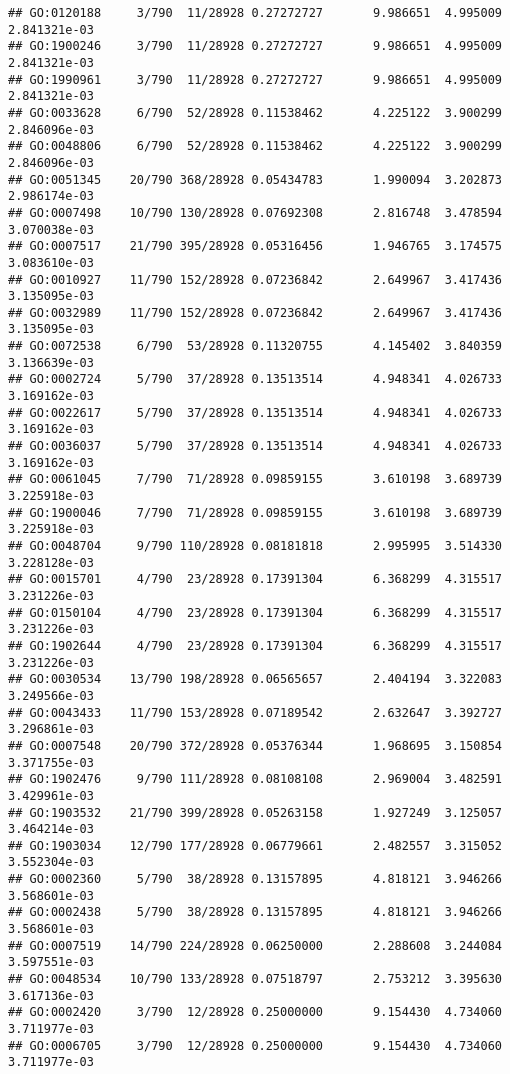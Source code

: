 \documentclass[
]{article}
\begin{document}
\begin{verbatim}
## GO:0120188     3/790  11/28928 0.27272727       9.986651  4.995009 2.841321e-03
## GO:1900246     3/790  11/28928 0.27272727       9.986651  4.995009 2.841321e-03
## GO:1990961     3/790  11/28928 0.27272727       9.986651  4.995009 2.841321e-03
## GO:0033628     6/790  52/28928 0.11538462       4.225122  3.900299 2.846096e-03
## GO:0048806     6/790  52/28928 0.11538462       4.225122  3.900299 2.846096e-03
## GO:0051345    20/790 368/28928 0.05434783       1.990094  3.202873 2.986174e-03
## GO:0007498    10/790 130/28928 0.07692308       2.816748  3.478594 3.070038e-03
## GO:0007517    21/790 395/28928 0.05316456       1.946765  3.174575 3.083610e-03
## GO:0010927    11/790 152/28928 0.07236842       2.649967  3.417436 3.135095e-03
## GO:0032989    11/790 152/28928 0.07236842       2.649967  3.417436 3.135095e-03
## GO:0072538     6/790  53/28928 0.11320755       4.145402  3.840359 3.136639e-03
## GO:0002724     5/790  37/28928 0.13513514       4.948341  4.026733 3.169162e-03
## GO:0022617     5/790  37/28928 0.13513514       4.948341  4.026733 3.169162e-03
## GO:0036037     5/790  37/28928 0.13513514       4.948341  4.026733 3.169162e-03
## GO:0061045     7/790  71/28928 0.09859155       3.610198  3.689739 3.225918e-03
## GO:1900046     7/790  71/28928 0.09859155       3.610198  3.689739 3.225918e-03
## GO:0048704     9/790 110/28928 0.08181818       2.995995  3.514330 3.228128e-03
## GO:0015701     4/790  23/28928 0.17391304       6.368299  4.315517 3.231226e-03
## GO:0150104     4/790  23/28928 0.17391304       6.368299  4.315517 3.231226e-03
## GO:1902644     4/790  23/28928 0.17391304       6.368299  4.315517 3.231226e-03
## GO:0030534    13/790 198/28928 0.06565657       2.404194  3.322083 3.249566e-03
## GO:0043433    11/790 153/28928 0.07189542       2.632647  3.392727 3.296861e-03
## GO:0007548    20/790 372/28928 0.05376344       1.968695  3.150854 3.371755e-03
## GO:1902476     9/790 111/28928 0.08108108       2.969004  3.482591 3.429961e-03
## GO:1903532    21/790 399/28928 0.05263158       1.927249  3.125057 3.464214e-03
## GO:1903034    12/790 177/28928 0.06779661       2.482557  3.315052 3.552304e-03
## GO:0002360     5/790  38/28928 0.13157895       4.818121  3.946266 3.568601e-03
## GO:0002438     5/790  38/28928 0.13157895       4.818121  3.946266 3.568601e-03
## GO:0007519    14/790 224/28928 0.06250000       2.288608  3.244084 3.597551e-03
## GO:0048534    10/790 133/28928 0.07518797       2.753212  3.395630 3.617136e-03
## GO:0002420     3/790  12/28928 0.25000000       9.154430  4.734060 3.711977e-03
## GO:0006705     3/790  12/28928 0.25000000       9.154430  4.734060 3.711977e-03

\end{verbatim}
\end{document}
